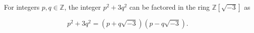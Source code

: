 For integers $p, q \in \mathbb{Z}$, the integer $p^2 + 3q^2$ can be factored in the ring $\mathbb{Z}[\sqrt{-3}]$ as

$$
p^2 + 3q^2 = (p + q\sqrt{-3})(p - q\sqrt{-3}).
$$
